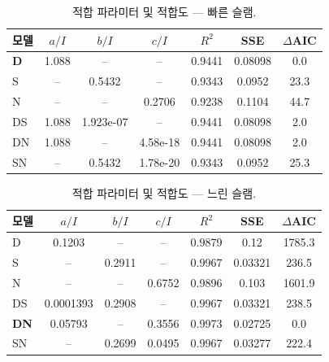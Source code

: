 \begin{table}[h]\centering
\caption{적합 파라미터 및 적합도 --- 빠른 슬램.}
\label{tab:fits_fast}
\begin{tabular}{lcccccc}
\toprule
모델 & $a/I$ & $b/I$ & $c/I$ & $R^2$ & SSE & $\Delta$AIC \\
\midrule
\textbf{D} & 1.088 & -- & -- & 0.9441 & 0.08098 & 0.0 \\
S & -- & 0.5432 & -- & 0.9343 & 0.0952 & 23.3 \\
N & -- & -- & 0.2706 & 0.9238 & 0.1104 & 44.7 \\
DS & 1.088 & 1.923e-07 & -- & 0.9441 & 0.08098 & 2.0 \\
DN & 1.088 & -- & 4.58e-18 & 0.9441 & 0.08098 & 2.0 \\
SN & -- & 0.5432 & 1.78e-20 & 0.9343 & 0.0952 & 25.3 \\
\bottomrule
\end{tabular}
\end{table}

\begin{table}[h]\centering
\caption{적합 파라미터 및 적합도 --- 느린 슬램.}
\label{tab:fits_slow}
\begin{tabular}{lcccccc}
\toprule
모델 & $a/I$ & $b/I$ & $c/I$ & $R^2$ & SSE & $\Delta$AIC \\
\midrule
D & 0.1203 & -- & -- & 0.9879 & 0.12 & 1785.3 \\
S & -- & 0.2911 & -- & 0.9967 & 0.03321 & 236.5 \\
N & -- & -- & 0.6752 & 0.9896 & 0.103 & 1601.9 \\
DS & 0.0001393 & 0.2908 & -- & 0.9967 & 0.03321 & 238.5 \\
\textbf{DN} & 0.05793 & -- & 0.3556 & 0.9973 & 0.02725 & 0.0 \\
SN & -- & 0.2699 & 0.0495 & 0.9967 & 0.03277 & 222.4 \\
\bottomrule
\end{tabular}
\end{table}
